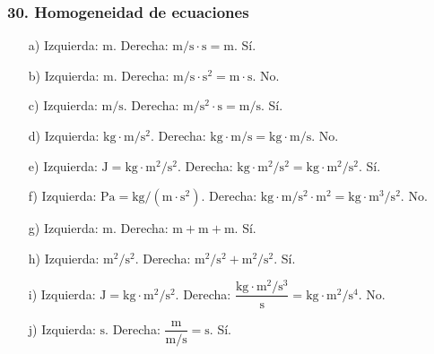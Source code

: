 \subsubsection*{30. Homogeneidad de ecuaciones}
\begin{enumerate}
    \item[a)] Izquierda: $\mathrm{m}$.
    Derecha: $\mathrm{m/s}\cdot\mathrm{s}=\mathrm{m}$.
    Sí.

    \item[b)] Izquierda: $\mathrm{m}$.
    Derecha: $\mathrm{m/s}\cdot\mathrm{s^2}=\mathrm{m\cdot s}$.
    No.

    \item[c)] Izquierda: $\mathrm{m/s}$.
    Derecha: $\mathrm{m/s^2}\cdot\mathrm{s}=\mathrm{m/s}$.
    Sí.

    \item[d)] Izquierda: $\mathrm{kg\cdot m/s^2}$.
    Derecha: $\mathrm{kg}\cdot\mathrm{m/s}=\mathrm{kg\cdot m/s}$.
    No.

    \item[e)] Izquierda:
    $\mathrm{J}=\mathrm{kg\cdot m^2/s^2}$.
    Derecha:
    $\mathrm{kg}\cdot\mathrm{m^2/s^2}=\mathrm{kg\cdot m^2/s^2}$.
    Sí.

    \item[f)] Izquierda:
    $\mathrm{Pa}=\mathrm{kg/(m\cdot s^2)}$.
    Derecha:
    $\mathrm{kg\cdot m/s^2}\cdot\mathrm{m^2}
    =\mathrm{kg\cdot m^3/s^2}$.
    No.

    \item[g)] Izquierda: $\mathrm{m}$.
    Derecha: $\mathrm{m}+\mathrm{m}+\mathrm{m}$.
    Sí.

    \item[h)] Izquierda: $\mathrm{m^2/s^2}$.
    Derecha: $\mathrm{m^2/s^2}+\mathrm{m^2/s^2}$.
    Sí.

    \item[i)] Izquierda:
    $\mathrm{J}=\mathrm{kg\cdot m^2/s^2}$.
    Derecha:
    $\dfrac{\mathrm{kg\cdot m^2/s^3}}{\mathrm{s}}
    =\mathrm{kg\cdot m^2/s^4}$.
    No.

    \item[j)] Izquierda: $\mathrm{s}$.
    Derecha:
    $\dfrac{\mathrm{m}}{\mathrm{m/s}}=\mathrm{s}$.
    Sí.
\end{enumerate}